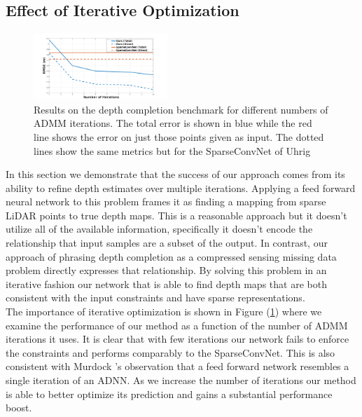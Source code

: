 \subsection{Effect of Iterative Optimization}
\label{sec:effect-iter-optim}
\begin{figure}
  \centering
  \includegraphics[width=0.45\textwidth]{iter_plot}
  \caption{Results on the depth completion benchmark for different numbers of ADMM iterations. The total error is shown in blue while the red line shows the error on just those points given as input. The dotted lines show the same metrics but for the SparseConvNet of Uhrig \etal}
  \label{fig:iterplot}
\end{figure}

In this section we demonstrate that the success of our approach comes from its ability to refine depth estimates over multiple iterations. Applying a feed forward neural network to this problem frames it as finding a mapping from sparse LiDAR points to true depth maps. This is a reasonable approach but it doesn't utilize all of the available information, specifically it doesn't encode the relationship that input samples are a subset of the output. In contrast, our approach of phrasing depth completion as a compressed sensing missing data problem directly expresses that relationship. By solving this problem in an iterative fashion our network that is able to find depth maps that are both consistent with the input constraints and have sparse representations.\\

The importance of iterative optimization is shown in Figure (\ref{fig:iterplot}) where we examine the performance of our method as a function of the number of ADMM iterations it uses. It is clear that with few iterations our network fails to enforce the constraints and performs comparably to the SparseConvNet. This is also consistent with Murdock \etal's observation that a feed forward network resembles a single iteration of an ADNN. As we increase the number of iterations our method is able to better optimize its prediction and gains a substantial performance boost.



